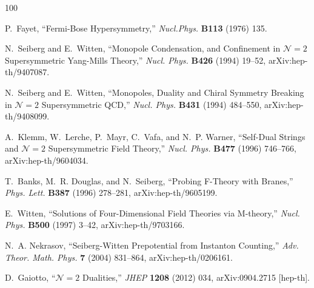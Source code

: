 \providecommand{\href}[2]{#2}\begingroup\raggedright\begin{thebibliography}{100}

P.~Fayet, ``{Fermi-Bose Hypersymmetry},''
\href{http://dx.doi.org/10.1016/0550-3213(76)90458-2}{{\em Nucl.Phys.} {\bfseries B113} (1976) 135}.

N.~Seiberg and E.~Witten, ``{Monopole Condensation, and Confinement in ${\mathcal{N}}\!=2$ Supersymmetric Yang-Mills Theory},''
\href{http://dx.doi.org/10.1016/0550-3213(94)90124-4}{{\em Nucl. Phys.} {\bfseries B426} (1994) 19--52},
\href{http://arxiv.org/abs/hep-th/9407087}{{\ttfamily arXiv:hep-th/9407087}}.

N.~Seiberg and E.~Witten, ``{Monopoles, Duality and Chiral Symmetry Breaking in ${\mathcal{N}}\!=2$ Supersymmetric QCD},''
\href{http://dx.doi.org/10.1016/0550-3213(94)90214-3}{{\em Nucl. Phys.} {\bfseries B431} (1994) 484--550},
\href{http://arxiv.org/abs/hep-th/9408099}{{\ttfamily arXiv:hep-th/9408099}}.

A.~Klemm, W.~Lerche, P.~Mayr, C.~Vafa, and N.~P. Warner, ``{Self-Dual Strings and ${\mathcal{N}}\!=2$ Supersymmetric Field Theory},''
\href{http://dx.doi.org/10.1016/0550-3213(96)00353-7}{{\em Nucl. Phys.} {\bfseries B477} (1996) 746--766},
\href{http://arxiv.org/abs/hep-th/9604034}{{\ttfamily arXiv:hep-th/9604034}}.

T.~Banks, M.~R. Douglas, and N.~Seiberg, ``{Probing F-Theory with Branes},''
\href{http://dx.doi.org/10.1016/0370-2693(96)00808-8}{{\em Phys. Lett.} {\bfseries B387} (1996) 278--281},
\href{http://arxiv.org/abs/hep-th/9605199}{{\ttfamily arXiv:hep-th/9605199}}.

E.~Witten, ``{Solutions of Four-Dimensional Field Theories via M-theory},''
\href{http://dx.doi.org/10.1016/S0550-3213(97)00416-1}{{\em Nucl. Phys.} {\bfseries B500} (1997) 3--42},
\href{http://arxiv.org/abs/hep-th/9703166}{{\ttfamily arXiv:hep-th/9703166}}.

N.~A. Nekrasov, ``{Seiberg-Witten Prepotential from Instanton Counting},'' {\em Adv. Theor. Math. Phys.} {\bfseries 7} (2004) 831--864,
\href{http://arxiv.org/abs/hep-th/0206161}{{\ttfamily arXiv:hep-th/0206161}}.

D.~Gaiotto, ``{${\mathcal{N}}\!=2$ Dualities},''
\href{http://dx.doi.org/10.1007/JHEP08(2012)034}{{\em JHEP} {\bfseries 1208} (2012) 034},
\href{http://arxiv.org/abs/0904.2715}{{\ttfamily arXiv:0904.2715 [hep-th]}}.


\end{thebibliography}
